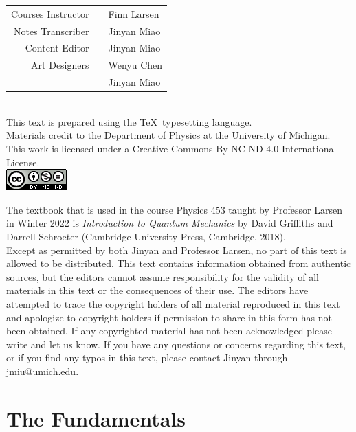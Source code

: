 \documentclass[11pt]{book}
\theoremstyle{break}
\theoremstyle{break}
\begin{document}
\tableofcontents
{}

\newpage
\setcounter{page}{1}
\vspace*{\fill}


\begin{center}
\begin{tabular}{rcl}
Courses Instructor & & Finn Larsen \medskip
\\
Notes Transcriber & & Jinyan Miao\medskip
\\
Content Editor & & Jinyan Miao \medskip
\\
Art Designers & & Wenyu Chen \\
 & & Jinyan Miao \bigskip
\end{tabular} \\
This text is prepared using the \TeX\ typesetting language. \\
Materials credit to the Department of Physics at the University of Michigan.\\
This work is licensed under a Creative Commons By-NC-ND 4.0 International License.  \\
\medskip
\includegraphics[scale=0.8]{cclisence.png}
\end{center}

\hfill\break
\hfill\break
The textbook that is used in the course Physics 453 taught by Professor Larsen in Winter 2022 is \textit{Introduction to Quantum Mechanics} by David Griffiths and Darrell Schroeter (Cambridge University Press, Cambridge, 2018). \\


Except as permitted by both Jinyan and Professor Larsen, no part of this text is allowed to be distributed. This text contains information obtained from authentic sources, but the editors cannot assume responsibility for the validity of all materials in this text or the consequences of their use. The editors have attempted to trace the copyright holders of all material reproduced in this text and apologize to copyright holders if permission to share in this form has not been obtained. If any copyrighted material has not been acknowledged please write and let us know. If you have any questions or concerns regarding this text, or if you find any typos in this text, please contact Jinyan through \url{jmiu@umich.edu}.

\newpage
\chapter{The Fundamentals}
\end{document}
